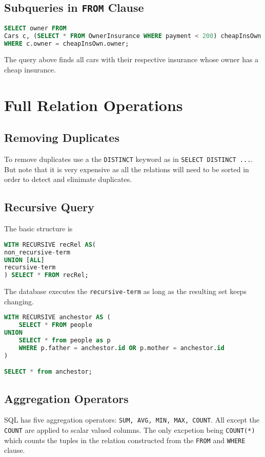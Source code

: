 \documentclass{sciposter}
\renewcommand{\t}[1]{\texttt{#1}}
\begin{document}
\begin{multicols}{3}
\subsection*{Subqueries in \t{FROM} Clause}

\begin{lstlisting}[language=SQL]
SELECT owner FROM
Cars c, (SELECT * FROM OwnerInsurance WHERE payment < 200) cheapInsOwn
WHERE c.owner = cheapInsOwn.owner;
\end{lstlisting}
The query above finds all cars with their respective insurance whose owner has a cheap insurance.

\section*{Full Relation Operations}

\subsection*{Removing Duplicates}

To remove duplicates use a the  \t{DISTINCT} keyword as in \t{SELECT DISTINCT ...}. But note that it is very expensive as all the relations will need to be sorted in order to detect and elinimate duplicates. 


\subsection*{Recursive Query}
The basic structure is 
\begin{lstlisting}[language=SQL]
WITH RECURSIVE recRel AS(
non_recursive-term
UNION [ALL]
recursive-term
) SELECT * FROM recRel;
\end{lstlisting}
The database executes the \t{recursive-term} as long as the resulting set keeps changing.
\begin{lstlisting}[language=SQL]
WITH RECURSIVE anchestor AS (
	SELECT * FROM people
UNION
	SELECT * from people as p
	WHERE p.father = anchestor.id OR p.mother = anchestor.id
)

SELECT * from anchestor;
\end{lstlisting}

\subsection*{Aggregation Operators}

SQL has five aggregation operators: \texttt{SUM, AVG, MIN, MAX, COUNT}. All except the \t{COUNT} are applied to scalar valued columns. The only excpetion being \t{COUNT(*)} which counts the tuples in the relation constructed from the \t{FROM} and \t{WHERE} clause.


\end{multicols}
\end{document}
